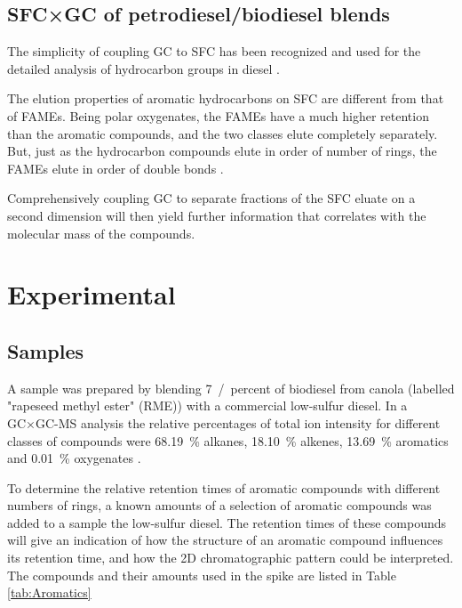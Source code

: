 \subsection{SFC×GC of petrodiesel/biodiesel blends}

The simplicity of coupling GC to SFC has been recognized and used for the
detailed analysis of hydrocarbon groups in diesel \autocite{Pal1998}.

The elution properties of aromatic hydrocarbons on SFC are different from that
of FAMEs. Being polar oxygenates, the FAMEs have a much higher retention than
the aromatic compounds, and the two classes elute completely separately. But,
just as the hydrocarbon compounds elute in order of number of rings, the FAMEs
elute in order of double bonds \autocite{Smith2001}. 

Comprehensively coupling GC to separate fractions of the SFC eluate on a second
dimension will then yield further information that correlates with the molecular
mass of the compounds.


\section{Experimental}

\subsection{Samples} 

A sample was prepared by blending \SI{7}{/percent} of biodiesel from canola
(labelled "rapeseed methyl ester" (RME)) with a commercial low-sulfur diesel. In a
GC×GC-MS analysis the relative percentages of total ion intensity for different
classes of compounds were \SI{68.19}{\percent} alkanes, \SI{18.10}{\percent}
alkenes, \SI{13.69}{\percent} aromatics and \SI{0.01}{\percent} oxygenates
\autocite{Smit2015}.

To determine the relative retention times of aromatic compounds with different
numbers of rings, a known amounts of a selection of aromatic compounds was added
to a sample the low-sulfur diesel. The retention times of these 
compounds will give an indication of how the structure of an aromatic compound
influences its retention time, and how the 2D chromatographic pattern could be
interpreted. The compounds and their amounts used in the spike are listed in
Table \ref{tab:Aromatics}


